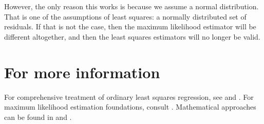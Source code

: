 However, the only reason this works is because we assume a normal distribution. That is one of the assumptions of least squares: a normally distributed set of residuals. If that is not the case, then the maximum likelihood estimator will be different altogether, and then the least squares estimators will no longer be valid.

\section*{For more information}
For comprehensive treatment of ordinary least squares regression, see \citep{fox} and \citep{hill}. For maximum likelihood estimation foundations, consult \citep{eliason1993maximum}. Mathematical approaches can be found in \citep{gill2006essential} and \citep{freedman2009statistical}.
